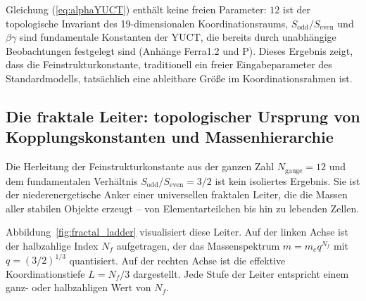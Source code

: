 \documentclass[12pt,a4paper]{article}
\begin{document}
	Gleichung (\ref{eq:alphaYUCT}) enthält keine freien Parameter: \(12\) ist der topologische Invariant des 19-dimensionalen Koordinationsraums, \(S_{\mathrm{odd}}/S_{\mathrm{even}}\) und \(\beta\gamma\) sind fundamentale Konstanten der YUCT, die bereits durch unabhängige Beobachtungen festgelegt sind (Anhänge Ferra1.2 und P).  
	Dieses Ergebnis zeigt, dass die Feinstrukturkonstante, traditionell ein freier Eingabeparameter des Standardmodells, tatsächlich eine ableitbare Größe im Koordinationsrahmen ist.
	
	\subsection{Die fraktale Leiter: topologischer Ursprung von Kopplungskonstanten und Massenhierarchie}
	\label{sec:fractal_ladder}
	
	Die Herleitung der Feinstrukturkonstante aus der ganzen Zahl \(N_{\mathrm{gauge}}=12\) und dem fundamentalen Verhältnis \(S_{\mathrm{odd}}/S_{\mathrm{even}}=3/2\) ist kein isoliertes Ergebnis. Sie ist der niederenergetische Anker einer universellen fraktalen Leiter, die die Massen aller stabilen Objekte erzeugt – von Elementarteilchen bis hin zu lebenden Zellen.
	
	Abbildung~\ref{fig:fractal_ladder} visualisiert diese Leiter. Auf der linken Achse ist der halbzahlige Index \(N_f\) aufgetragen, der das Massenspektrum \(m = m_e q^{N_f}\) mit \(q = (3/2)^{1/3}\) quantisiert. Auf der rechten Achse ist die effektive Koordinationstiefe \(L = N_f/3\) dargestellt. Jede Stufe der Leiter entspricht einem ganz- oder halbzahligen Wert von \(N_f\).
	
\end{document}
